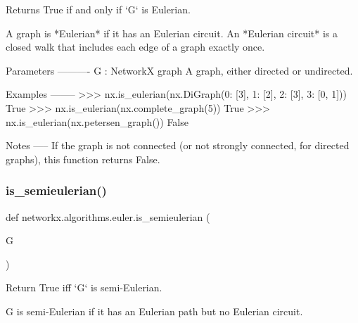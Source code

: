 \begin{DoxyVerb}Returns True if and only if `G` is Eulerian.

A graph is *Eulerian* if it has an Eulerian circuit. An *Eulerian
circuit* is a closed walk that includes each edge of a graph exactly
once.

Parameters
----------
G : NetworkX graph
   A graph, either directed or undirected.

Examples
--------
>>> nx.is_eulerian(nx.DiGraph({0: [3], 1: [2], 2: [3], 3: [0, 1]}))
True
>>> nx.is_eulerian(nx.complete_graph(5))
True
>>> nx.is_eulerian(nx.petersen_graph())
False

Notes
-----
If the graph is not connected (or not strongly connected, for
directed graphs), this function returns False.\end{DoxyVerb}
 \mbox{\label{namespacenetworkx_1_1algorithms_1_1euler_ae4acc5b331c9f63351968abd4e2f3982}} 
\subsubsection{\texorpdfstring{is\+\_\+semieulerian()}{is\_semieulerian()}}
{\footnotesize\ttfamily def networkx.\+algorithms.\+euler.\+is\+\_\+semieulerian (\begin{DoxyParamCaption}\item[{}]{G }\end{DoxyParamCaption})}

\begin{DoxyVerb}Return True iff `G` is semi-Eulerian.

G is semi-Eulerian if it has an Eulerian path but no Eulerian circuit.
\end{DoxyVerb}
 